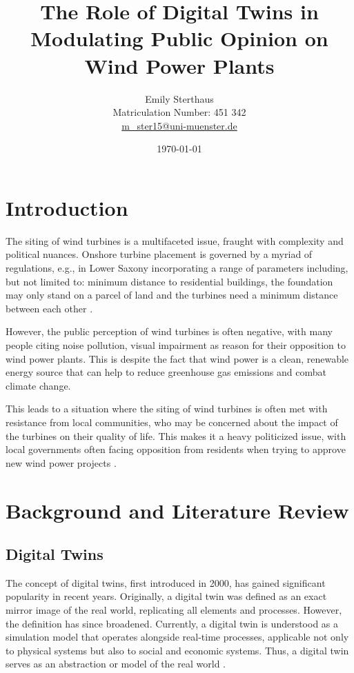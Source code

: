 \documentclass[11pt, titlepage, a4paper]{scrartcl}
\title{The Role of Digital Twins in Modulating Public Opinion on Wind Power Plants}
\author{Emily Sterthaus \\ Matriculation Number: 451 342 \\ \href{mailto:m_ster15@uni-muenster.de}{m\_ster15@uni-muenster.de}}
\affil{Institute of Geoinformatics, University of Münster}
\date{\today}
\begin{document}
\maketitle


\newpage
\tableofcontents
\newpage
\begin{linenumbers}
    \section{Introduction}
    The siting of wind turbines is a multifaceted issue, fraught with complexity and political nuances. Onshore
    turbine placement is governed by a myriad of regulations, e.g., in Lower Saxony incorporating a range of parameters including, but not
    limited to: minimum distance to residential buildings, the foundation may only stand on a parcel of land and the
    turbines need a minimum distance between each other
    \cite{niedersachsischesministeriumfurumweltenergieundklimaschutzPlanungUndGenehmigung2021}.

    However, the public perception of wind turbines is often negative, with many people citing noise pollution, visual impairment as reason for their opposition to wind power plants. This is despite the fact that wind power is a clean, renewable energy source that can help to reduce greenhouse gas emissions and combat climate change.

    This leads to a situation where the siting of wind turbines is often met with resistance from local communities, who may be concerned about the impact of the turbines on their quality of life. This makes it a heavy politicized issue, with local governments often facing opposition from residents when trying to approve new wind power projects \cite{kwasniewskiWindenergieVerhindertAntiWindkraftBewegung2021}.

    \section{Background and Literature Review}
    \subsection{Digital Twins}
    The concept of digital twins, first introduced in 2000, has gained significant popularity in recent years. Originally, a digital twin was defined as an exact mirror image of the real world, replicating all elements and processes. However, the definition has since broadened. Currently, a digital twin is understood as a simulation model that operates alongside real-time processes, applicable not only to physical systems but also to social and economic systems. Thus, a digital twin serves as an abstraction or model of the real world \cite{battyDigitalTwins2018}.


\end{linenumbers}
\end{document}
